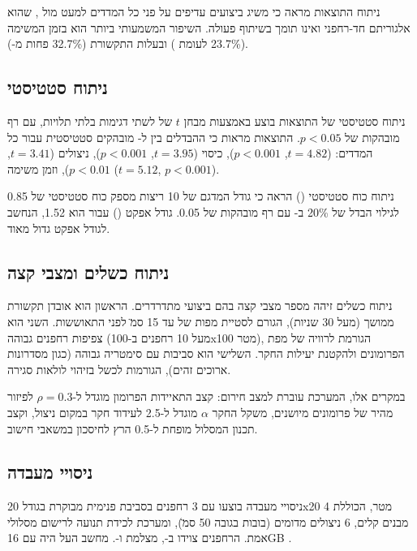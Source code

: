 ניתוח התוצאות מראה כי  משיג ביצועים עדיפים על פני כל המדדים למעט  מול , שהוא אלגוריתם חד-רחפני ואינו תומך בשיתוף פעולה. השיפור המשמעותי ביותר הוא בזמן המשימה (23.7\% לעומת ) ובעלות התקשורת (32.7\% פחות מ-).

\subsection{ניתוח סטטיסטי}
\label{sec:ch08_statistical_analysis}

ניתוח סטטיסטי של התוצאות בוצע באמצעות מבחן $t$ של  לשתי דגימות בלתי תלויות, עם רף מובהקות של $p < 0.05$. התוצאות מראות כי ההבדלים בין  ל- מובהקים סטטיסטית עבור כל המדדים:  ($t = 4.82$, $p < 0.001$), כיסוי ($t = 3.95$, $p < 0.001$), ניצולים ($t = 3.41$, $p < 0.01$), וזמן משימה ($t = 5.12$, $p < 0.001$).

ניתוח כוח סטטיסטי () הראה כי גודל המדגם של 10 ריצות מספק כוח סטטיסטי של 0.85 לגילוי הבדל של 20\% ב- עם רף מובהקות של 0.05. גודל אפקט ()  עבור  הוא 1.52, הנחשב לגודל אפקט גדול מאוד.

\subsection{ניתוח כשלים ומצבי קצה}
\label{sec:ch08_failure_modes}

ניתוח כשלים זיהה מספר מצבי קצה בהם ביצועי  מתדרדרים. הראשון הוא אובדן תקשורת ממושך (מעל 30 שניות), הגורם לסטיית מפות של עד 15 ס\"מ לפני התאוששות. השני הוא צפיפות רחפנים גבוהה (מעל 10 רחפנים ב-100x100 מטר), הגורמת לרוויה של מפת הפרומונים ולהקטנת יעילות החקר. השלישי הוא סביבות עם סימטריה גבוהה (כגון מסדרונות ארוכים זהים), הגורמות לכשל בזיהוי לולאות סגירה.

במקרים אלו, המערכת עוברת למצב חירום: קצב התאיידות הפרומון מוגדל ל-$\rho = 0.3$ לפיזור מהיר של פרומונים מיושנים, משקל החקר $\alpha$ מוגדל ל-2.5 לעידוד חקר במקום ניצול, וקצב תכנון המסלול מופחת ל-0.5 הרץ לחיסכון במשאבי חישוב.

\subsection{ניסויי מעבדה}
\label{sec:ch08_lab_experiments}

ניסויי מעבדה בוצעו עם 3 רחפנים בסביבת  פנימית מבוקרת בגודל 20x20 מטר, הכוללת 4 מבנים קלים, 6 ניצולים מדומים (בובות בגובה 50 ס\"מ), ומערכת לכידת תנועה  לרישום מסלולי אמת. הרחפנים צוידו ב-, מצלמת  ו-. מחשב העל היה  עם 16GB .

